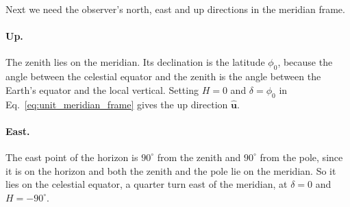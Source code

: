 Next we need the observer's north, east and up directions in the meridian frame.

\paragraph{Up.} The zenith lies on the meridian. Its declination is the latitude $\phi_0$, because the angle between the celestial equator and the zenith is the angle between the Earth's equator and the local vertical. Setting $H=0$ and $\delta=\phi_0$ in Eq.~\eqref{eq:unit_meridian_frame} gives the up direction $\hat{\mathbf u}$.

\paragraph{East.} The east point of the horizon is $90^\circ$ from the zenith and $90^\circ$ from the pole, since it is on the horizon and both the zenith and the pole lie on the meridian. So it lies on the celestial equator, a quarter turn east of the meridian, at $\delta=0$ and $H=-90^\circ$.

